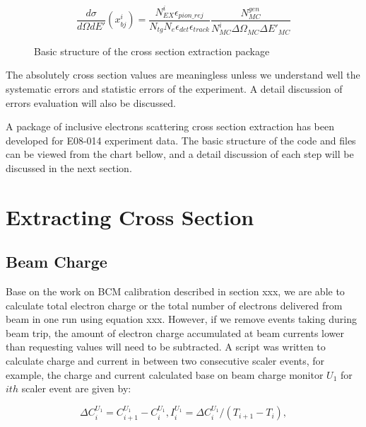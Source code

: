 \documentclass[a4paper,10.5pt]{article}
\begin{document}
\begin{equation}
 \frac{d\sigma}{d\Omega dE'}(x_{bj}^{i}) = \frac{N_{EX}^{i} \epsilon_{pion\_rej}}{N_{tg} N_{e} \epsilon_{det} \epsilon_{track}} \frac{N_{MC}^{gen}}{N_{MC}^{i} \Delta\Omega_{MC} \Delta E'_{MC}}
\end{equation}

\begin{figure}[h!]
\centerline{}
\caption[Basic structure of the cross section extraction package]{\footnotesize{Basic structure of the cross section extraction package}
\label{xs_chart}}
\end{figure}

The absolutely cross section values are meaningless unless we understand well the systematic errors and statistic errors of the experiment. A detail discussion of errors evaluation will also be discussed.

A package of inclusive electrons scattering cross section extraction has been developed for E08-014 experiment data. The basic structure of the code and files can be viewed from the chart bellow, and a detail discussion of each step will be discussed in the next section.

\section{Extracting Cross Section}

\subsection{Beam Charge}
Base on the work on BCM calibration described in section xxx, we are able to calculate total electron charge or the total number of electrons delivered from beam in one run using equation xxx. However, if we remove events taking during beam trip, the amount of electron charge accumulated at beam currents lower than requesting values will need to be subtracted. A script was written to calculate charge and current in between two consecutive scaler events, for example, the charge and current calculated base on beam charge monitor $U_{1}$ for $ith$ scaler event are given by:

\begin{equation}
  \Delta C_{i}^{U_{1}} = C_{i+1}^{U_{1}} - C_{i}^{U_{1}},  I_{i}^{U_{1}} = \Delta C_{i}^{U_{1}}/(T_{i+1}-T_{i}),
\end{equation}
\end{document}
